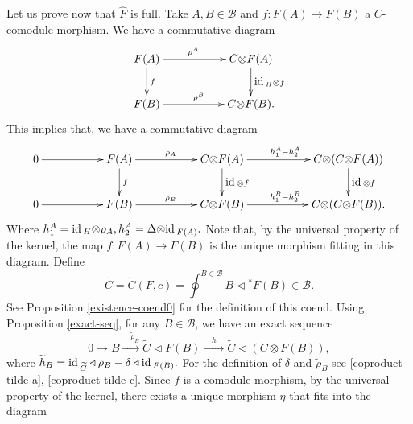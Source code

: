 \documentclass[11pt]{amsart}
\newcommand{\ot}{{\otimes}}
\newcommand{\Bc}{{\mathcal B}}
\newcommand{\id}{\mbox{\rm id\,}}
\renewcommand{\_}[1]{\mbox{$_{\left( #1 \right)}$}}
\theoremstyle{plain}
\numberwithin{equation}{section}
\theoremstyle{definition}
\theoremstyle{remark}
\theoremstyle{introTheorems}
\begin{document}
\medbreak

Let us prove now that $\widehat{F}$ is full. Take $A, B\in \Bc$ and $f:F(A)\to F(B)$ a $C$-comodule morphism. We have a commutative diagram
\begin{equation}\label{comodule}
\xymatrix{
 F(A)\ar[d]^{f}\ar[rr]^{\rho^A\quad}&& C\ot  F(A)  
 \ar[d]^{\id_H\ot f} \\
 F(B) \ar[rr]^{\rho^B }&&  C\ot  F(B).}
\end{equation}
 This implies that, we have a commutative diagram \begin{equation}\label{F-bef}
          \begin{split}
           \xymatrix{
         0 
         \ar[rr]  
         && 
         F(A)
         \ar[rr]^{ \rho_A} 
         \ar[d]^f 
         && 
         C \ot F(A )
		  \ar[rr]^{h^A_1-h^A_2}
		\ar[d]^{\id  \ot f } 
		&&
		C \ot (C\ot F(A ) )
		\ar[d]^{\id\ot f}
		\\
		 0
         \ar[rr] 
         && 
          F(B)
         \ar[rr]^{\rho_B} 
          && 
         C \ot F(B )
           \ar[rr]^{h^B_1-h^B_2}
			&&
			C \ot (C\ot F(B ) ).
\\
              }
           \end{split}
      \end{equation}
Where $h^A_1= \id_H\ot \rho_A, h^A_2=\Delta\ot \id_{F(A)}.$ Note that, by the universal property of the kernel, the map $f:F(A)\to F(B)$ is the unique morphism fitting in this diagram. Define
$$ \widetilde{C}=\widetilde{C}(F,c)=\oint^{B\in \Bc} B \triangleleft {}^*F(B)\in \Bc.$$
See Proposition \ref{existence-coend0} for the definition of this coend. Using Proposition \ref{exact-seq}, for any $B\in \Bc$, we have an exact sequence
$$0\to B\xrightarrow{\quad\widetilde{\rho}_B}
\widetilde{C} \triangleleft F(B ) \xrightarrow{\quad \widetilde{h}\quad }  \widetilde{C} \triangleleft (C\ot F(B ) ),
$$
where $\widetilde{h}_B=\id_{\widetilde{C} } \triangleleft \rho_B- \delta\triangleleft  \id_{F(B)}.$ For the definition of $\delta$ and $ \widetilde{\rho}_B$ see \eqref{coproduct-tilde-a}, \eqref{coproduct-tilde-c}. Since $f$ is a comodule morphism, by the universal property of the kernel, there exists a unique morphism $\eta$ that fits into the diagram
\end{document}
